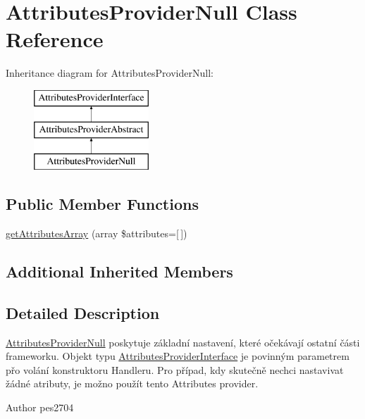 \hypertarget{class_pes_1_1_database_1_1_handler_1_1_attributes_provider_1_1_attributes_provider_null}{}\section{Attributes\+Provider\+Null Class Reference}
\label{class_pes_1_1_database_1_1_handler_1_1_attributes_provider_1_1_attributes_provider_null}
Inheritance diagram for Attributes\+Provider\+Null\+:\begin{figure}[H]
\begin{center}
\leavevmode
\includegraphics[height=3.000000cm]{class_pes_1_1_database_1_1_handler_1_1_attributes_provider_1_1_attributes_provider_null}
\end{center}
\end{figure}
\subsection*{Public Member Functions}
\begin{DoxyCompactItemize}
\item 
\mbox{\hyperlink{class_pes_1_1_database_1_1_handler_1_1_attributes_provider_1_1_attributes_provider_null_a78e4a9edf711d48cd3ec22eaadf560ea}{get\+Attributes\+Array}} (array \$attributes=\mbox{[}$\,$\mbox{]})
\end{DoxyCompactItemize}
\subsection*{Additional Inherited Members}


\subsection{Detailed Description}
\mbox{\hyperlink{class_pes_1_1_database_1_1_handler_1_1_attributes_provider_1_1_attributes_provider_null}{Attributes\+Provider\+Null}} poskytuje základní nastavení, které očekávají ostatní části frameworku. Objekt typu \mbox{\hyperlink{interface_pes_1_1_database_1_1_handler_1_1_attributes_provider_1_1_attributes_provider_interface}{Attributes\+Provider\+Interface}} je povinným parametrem přo volání konstruktoru Handleru. Pro případ, kdy skutečně nechci nastavivat žádné atributy, je možno použít tento Attributes provider. \begin{DoxyAuthor}{Author}
pes2704 
\end{DoxyAuthor}


